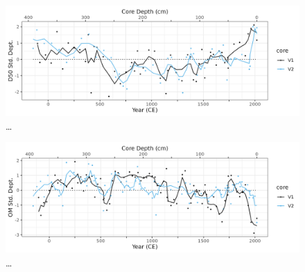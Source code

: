 \documentclass[
  letterpaper,
  DIV=11,
  numbers=noendperiod]{scrartcl}
\begin{document}
\begin{figure}

{\centering \includegraphics[width=1\textwidth,height=\textheight]{figs/V1_V2_grainsize_vs_depth_and_C14_est_yr.png}

}

\caption{\label{fig-particle}\ldots{}}

\end{figure}

\begin{figure}

{\centering \includegraphics[width=1\textwidth,height=\textheight]{figs/V1_V2_LOI_vs_depth_and_C14_est_yr.png}

}

\caption{\label{fig-loi}\ldots{}}

\end{figure}
\end{document}
